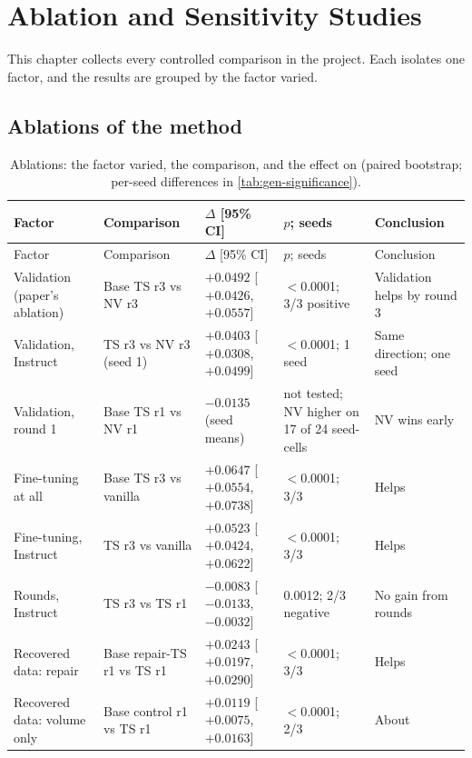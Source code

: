 \chapter{Ablation and Sensitivity Studies}\label{ch:ablations}

This chapter collects every controlled comparison in the project. Each isolates one factor, and the results are
grouped by the factor varied.

\section{Ablations of the method}

{\small
{}
\begin{longtable}{@{}p{3.3cm}p{3.6cm}p{2.5cm}p{2.7cm}p{2.5cm}@{}}
\caption{Ablations: the factor varied, the comparison, and the effect on \Mviii{} (paired bootstrap; per-seed
differences in \cref{tab:gen-significance}).}\label{tab:ablations}\\
\toprule\rowcolor{headshade}Factor & Comparison & $\Delta$ \Mviii{} [95\% CI] & $p$; seeds & Conclusion\\\midrule
\endfirsthead
\toprule\rowcolor{headshade}Factor & Comparison & $\Delta$ \Mviii{} [95\% CI] & $p$; seeds & Conclusion\\\midrule
\endhead
\bottomrule\endfoot
Validation (paper's ablation) & Base TS r3 vs NV r3 & $+0.0492$ [$+0.0426$, $+0.0557$] & $<$0.0001; 3/3 positive &
Validation helps by round 3\\
Validation, Instruct & TS r3 vs NV r3 (seed 1) & $+0.0403$ [$+0.0308$, $+0.0499$] & $<$0.0001; 1 seed & Same direction;
one seed\\
Validation, round 1 & Base TS r1 vs NV r1 & $-0.0135$ (seed means) & not tested; NV higher on 17 of 24 seed-cells &
NV wins early\\
Fine-tuning at all & Base TS r3 vs vanilla & $+0.0647$ [$+0.0554$, $+0.0738$] & $<$0.0001; 3/3 & Helps\\
Fine-tuning, Instruct & TS r3 vs vanilla & $+0.0523$ [$+0.0424$, $+0.0622$] & $<$0.0001; 3/3 & Helps\\
Rounds, Instruct & TS r3 vs TS r1 & $-0.0083$ [$-0.0133$, $-0.0032$] & 0.0012; 2/3 negative & No gain from rounds\\
Recovered data: repair & Base repair-TS r1 vs TS r1 & $+0.0243$ [$+0.0197$, $+0.0290$] & $<$0.0001; 3/3 & Helps\\
Recovered data: volume only & Base control r1 vs TS r1 & $+0.0119$ [$+0.0075$, $+0.0163$] & $<$0.0001; 2/3 & About

\end{longtable}}
